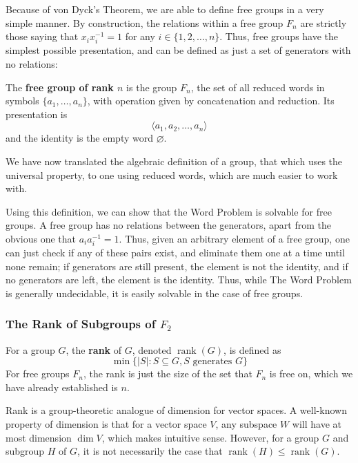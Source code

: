 Because of von Dyck's Theorem, we are able to define free groups in a very simple manner. By construction, the relations within a free group $F_n$ are strictly those saying that $x_ix_i^{-1} = 1$ for any $i \in \{1,2,\ldots, n\}$. Thus, free groups have the simplest possible presentation, and can be defined as just a set of generators with no relations:

\begin{defn}\label{Free Groups as Reduced Words}
    The \textbf{free group of rank $n$} is the group $F_n$, the set of all reduced words in symbols $\{a_1, \ldots, a_n\}$, with operation given by concatenation and reduction. Its presentation is 
    \[\langle a_1, a_2, \ldots, a_n \rangle\]
    and the identity is the empty word $\varnothing$. 
\end{defn}

We have now translated the algebraic definition of a group, that which uses the universal property, to one using reduced words, which are much easier to work with. 

Using this definition, we can show that the Word Problem is solvable for free groups. A free group has no relations between the generators, apart from the obvious one that $a_ia_i^{-1} = 1$. Thus, given an arbitrary element of a free group, one can just check if any of these pairs exist, and eliminate them one at a time until none remain; if generators are still present, the element is not the identity, and if no generators are left, the element is the identity. Thus, while The Word Problem is generally undecidable, it is easily solvable in the case of free groups. 

\subsubsection{The Rank of Subgroups of $F_2$}

For a group $G$, the \textbf{rank} of $G$, denoted $\operatorname{rank}(G)$, is defined as
\[ \min\{|S| : S \subseteq G, S \text{ generates $G$}\} \]
For free groups $F_n$, the rank is just the size of the set that $F_n$ is free on, which we have already established is $n$. 

Rank is a group-theoretic analogue of dimension for vector spaces. A well-known property of dimension is that for a vector space $V$, any subspace $W$ will have at most dimension $\dim V$, which makes intuitive sense. However, for a group $G$ and subgroup $H$ of $G$, it is not necessarily the case that $\operatorname{rank}(H) \leq \operatorname{rank}(G)$.  

